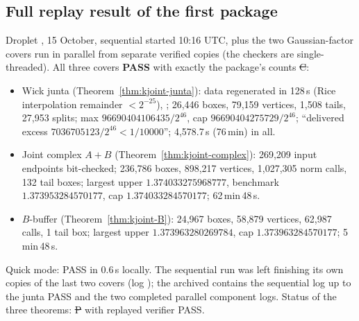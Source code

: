 \subsection{Full replay result of the first package}\label{sec:kjoint-fullresult}
Droplet , 15 October, sequential  started 10:16 UTC, plus the two Gaussian-factor covers run in parallel from separate verified copies
(the checkers are single-threaded). All three covers \textbf{PASS} with exactly the package's counts \st{C}:
\begin{itemize}
\item Wick junta (Theorem~\ref{thm:kjoint-junta}): data regenerated in 128\,s (Rice interpolation remainder $<2^{-25}$), ; 26,446 boxes, 79,159 vertices, 1,508 tails,
27,953 splits; max $96690404106435/2^{46}$, cap $96690404275729/2^{46}$; ``delivered excess $7036705123/2^{46}<1/10000$''; 4,578.7\,s (76\,min) in all.
\item Joint complex $A{+}B$ (Theorem~\ref{thm:kjoint-complex}): 269,209 input endpoints bit-checked; 236,786 boxes, 898,217 vertices, 1,027,305 norm calls, 132 tail boxes; largest upper
$1.374033275968777$, benchmark $1.373953284570177$, cap $1.374033284570177$; 62\,min\,48\,s.
\item $B$-buffer (Theorem~\ref{thm:kjoint-B}): 24,967 boxes, 58,879 vertices, 62,987 calls, 1 tail box; largest upper $1.373963280269784$, cap $1.373963284570177$; 5\,min\,48\,s.
\end{itemize}
Quick mode: PASS in 0.6\,s locally. The sequential run was left finishing its own copies of the last two covers (log ); the archived
 contains the sequential log up to the junta PASS and the two completed parallel component logs. Status of the three theorems: \st{P} with
replayed verifier PASS.
